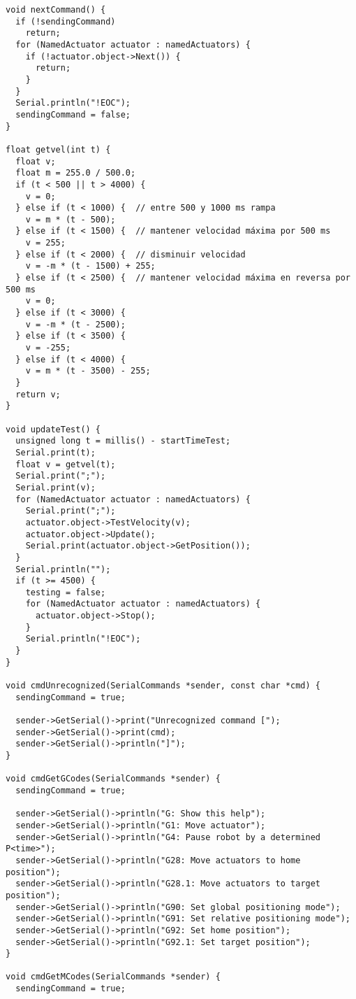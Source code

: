 \begin{verbatim}
void nextCommand() {
  if (!sendingCommand)
    return;
  for (NamedActuator actuator : namedActuators) {
    if (!actuator.object->Next()) {
      return;
    }
  }
  Serial.println("!EOC");
  sendingCommand = false;
}

float getvel(int t) {
  float v;
  float m = 255.0 / 500.0;
  if (t < 500 || t > 4000) {
    v = 0;
  } else if (t < 1000) {  // entre 500 y 1000 ms rampa
    v = m * (t - 500);
  } else if (t < 1500) {  // mantener velocidad máxima por 500 ms
    v = 255;
  } else if (t < 2000) {  // disminuir velocidad
    v = -m * (t - 1500) + 255;
  } else if (t < 2500) {  // mantener velocidad máxima en reversa por 500 ms
    v = 0;
  } else if (t < 3000) {
    v = -m * (t - 2500);
  } else if (t < 3500) {
    v = -255;
  } else if (t < 4000) {
    v = m * (t - 3500) - 255;
  }
  return v;
}

void updateTest() {
  unsigned long t = millis() - startTimeTest;
  Serial.print(t);
  float v = getvel(t);
  Serial.print(";");
  Serial.print(v);
  for (NamedActuator actuator : namedActuators) {
    Serial.print(";");
    actuator.object->TestVelocity(v);
    actuator.object->Update();
    Serial.print(actuator.object->GetPosition());
  }
  Serial.println("");
  if (t >= 4500) {
    testing = false;
    for (NamedActuator actuator : namedActuators) {
      actuator.object->Stop();
    }
    Serial.println("!EOC");
  }
}

void cmdUnrecognized(SerialCommands *sender, const char *cmd) {
  sendingCommand = true;

  sender->GetSerial()->print("Unrecognized command [");
  sender->GetSerial()->print(cmd);
  sender->GetSerial()->println("]");
}

void cmdGetGCodes(SerialCommands *sender) {
  sendingCommand = true;

  sender->GetSerial()->println("G: Show this help");
  sender->GetSerial()->println("G1: Move actuator");
  sender->GetSerial()->println("G4: Pause robot by a determined P<time>");
  sender->GetSerial()->println("G28: Move actuators to home position");
  sender->GetSerial()->println("G28.1: Move actuators to target position");
  sender->GetSerial()->println("G90: Set global positioning mode");
  sender->GetSerial()->println("G91: Set relative positioning mode");
  sender->GetSerial()->println("G92: Set home position");
  sender->GetSerial()->println("G92.1: Set target position");
}

void cmdGetMCodes(SerialCommands *sender) {
  sendingCommand = true;


\end{verbatim}
